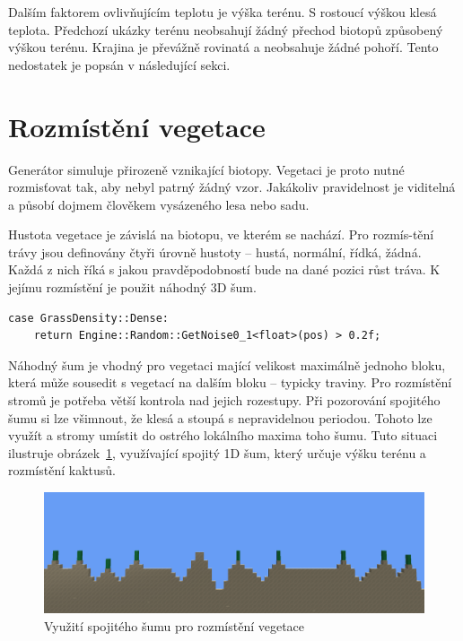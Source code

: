 \documentclass[thesis=M,czech]{FITthesis}[2019/12/23]
\begin{document}
Dalším faktorem ovlivňujícím teplotu je výška terénu. S rostoucí výškou klesá teplota. Předchozí ukázky terénu neobsahují žádný přechod biotopů způsobený výškou terénu. Krajina je převážně rovinatá a neobsahuje žádné pohoří. Tento nedostatek je popsán v následující sekci.

\section{Rozmístění vegetace}

Generátor simuluje přirozeně vznikající biotopy. Vegetaci je proto nutné rozmisťovat tak, aby nebyl patrný žádný vzor. Jakákoliv pravidelnost je viditelná a působí dojmem člověkem vysázeného lesa nebo sadu.

Hustota vegetace je závislá na biotopu, ve kterém se nachází. Pro rozmís-tění trávy jsou definovány čtyři úrovně hustoty -- hustá, normální, řídká, žádná. Každá z nich říká s jakou pravděpodobností bude na dané pozici růst tráva. K jejímu rozmístění je použit náhodný 3D šum.

\begin{verbatim}
case GrassDensity::Dense:
    return Engine::Random::GetNoise0_1<float>(pos) > 0.2f;
\end{verbatim}

Náhodný šum je vhodný pro vegetaci mající velikost maximálně jednoho bloku, která může sousedit s vegetací na dalším bloku -- typicky traviny. Pro rozmístění stromů je potřeba větší kontrola nad jejich rozestupy. Při pozorování spojitého šumu si lze všimnout, že klesá a stoupá s nepravidelnou periodou. Tohoto lze využít a stromy umístit do ostrého lokálního maxima toho šumu. Tuto situaci ilustruje obrázek~\ref{fig:cactus}, využívající spojitý 1D šum, který určuje výšku terénu a rozmístění kaktusů.

\begin{figure}\centering
	\includegraphics[width=\textwidth]{images/world_gen/cactus}
	\caption[Využití spojitého šumu pro rozmístění vegetace]{Využití spojitého šumu pro rozmístění vegetace}\label{fig:cactus}
\end{figure}
\end{document}
